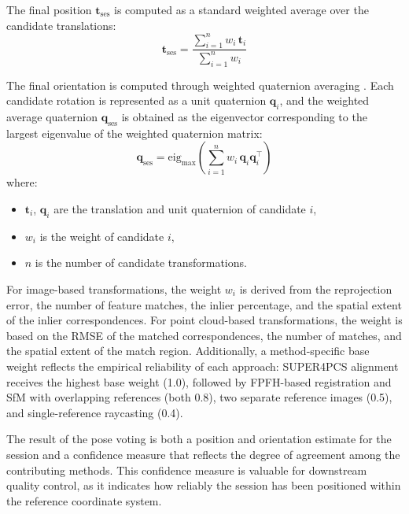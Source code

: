 The final position $\mathbf{t}_\text{ses}$ is computed as a standard weighted average over the candidate translations:
\begin{equation}
\label{eq:4_pose_vote_pos}
\mathbf{t}_\text{ses} = \frac{\sum_{i=1}^{n} w_i \, \mathbf{t}_i}{\sum_{i=1}^{n} w_i}
\end{equation}

The final orientation is computed through weighted quaternion averaging \cite{cheng_averaging_2007}. Each candidate rotation is represented as a unit quaternion $\mathbf{q}_i$, and the weighted average quaternion $\mathbf{q}_\text{ses}$ is obtained as the eigenvector corresponding to the largest eigenvalue of the weighted quaternion matrix:
\begin{equation}
\label{eq:4_pose_vote_rot}
\mathbf{q}_\text{ses} = \text{eig}_\text{max}\!\left(\sum_{i=1}^{n} w_i \, \mathbf{q}_i \mathbf{q}_i^\top\right)
\end{equation}
where:
\begin{itemize}
    \item $\mathbf{t}_i$, $\mathbf{q}_i$ are the translation and unit quaternion of candidate $i$,
    \item $w_i$ is the weight of candidate $i$,
    \item $n$ is the number of candidate transformations.
\end{itemize}

For image-based transformations, the weight $w_i$ is derived from the reprojection error, the number of feature matches, the inlier percentage, and the spatial extent of the inlier correspondences. For point cloud-based transformations, the weight is based on the \gls{RMSE} of the matched correspondences, the number of matches, and the spatial extent of the match region. Additionally, a method-specific base weight reflects the empirical reliability of each approach: \gls{SUPER4PCS} alignment receives the highest base weight (1.0), followed by \gls{FPFH}-based registration and \gls{SfM} with overlapping references (both 0.8), two separate reference images (0.5), and single-reference raycasting (0.4).

The result of the pose voting is both a position and orientation estimate for the session and a confidence measure that reflects the degree of agreement among the contributing methods. This confidence measure is valuable for downstream quality control, as it indicates how reliably the session has been positioned within the reference coordinate system.
